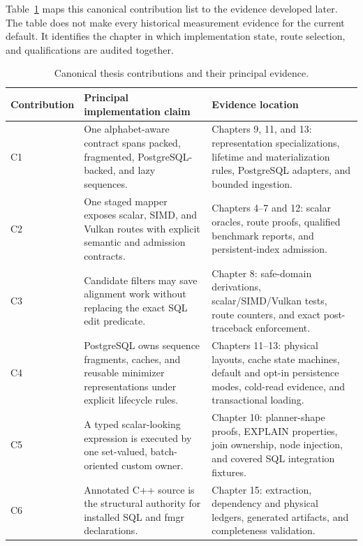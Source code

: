 Table~\ref{tab:solution-contribution-evidence} maps this canonical contribution
list to the evidence developed later.  The table does not make every
historical measurement evidence for the current default.  It identifies the
chapter in which implementation state, route selection, and qualifications
are audited together.

\begin{table}[htbp]
  \centering
  \small
  \caption{Canonical thesis contributions and their principal evidence.}
  \label{tab:solution-contribution-evidence}
  \begin{tabularx}{\linewidth}{p{.09\linewidth}p{.31\linewidth}X}
    \toprule
    Contribution & Principal implementation claim & Evidence location \\
    \midrule
    C1 & One alphabet-aware contract spans packed, fragmented,
    PostgreSQL-backed, and lazy sequences. &
    Chapters 9, 11, and 13: representation specializations, lifetime and
    materialization rules, PostgreSQL adapters, and bounded ingestion. \\
    C2 & One staged mapper exposes scalar, SIMD, and Vulkan routes with
    explicit semantic and admission contracts. &
    Chapters 4--7 and 12: scalar oracles, route proofs, qualified benchmark
    reports, and persistent-index admission. \\
    C3 & Candidate filters may save alignment work without replacing the
    exact SQL edit predicate. &
    Chapter 8: safe-domain derivations, scalar/SIMD/Vulkan tests, route
    counters, and exact post-traceback enforcement. \\
    C4 & PostgreSQL owns sequence fragments, caches, and reusable minimizer
    representations under explicit lifecycle rules. &
    Chapters 11--13: physical layouts, cache state machines, default and
    opt-in persistence modes, cold-read evidence, and transactional loading. \\
    C5 & A typed scalar-looking expression is executed by one set-valued,
    batch-oriented custom owner. &
    Chapter 10: planner-shape proofs, EXPLAIN properties, join ownership,
    node injection, and covered SQL integration fixtures. \\
    C6 & Annotated C++ source is the structural authority for installed SQL
    and fmgr declarations. &
    Chapter 15: extraction, dependency and physical ledgers, generated
    artifacts, and completeness validation. \\
    \bottomrule
  \end{tabularx}
\end{table}

